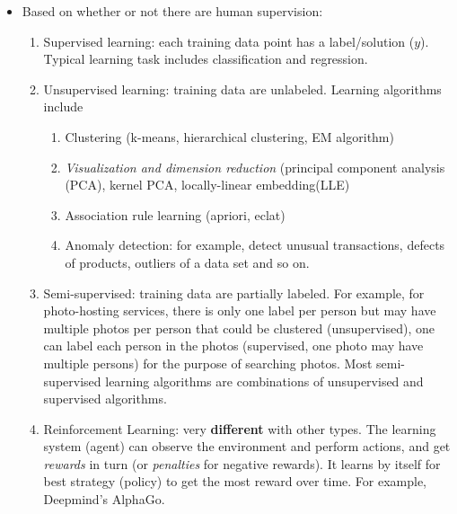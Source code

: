 \documentclass[12pt,oneside,a4paper]{article}
\numberwithin{equation}{section}
\begin{document}
\begin{itemize}
\item Based on whether or not there are human supervision: 
\begin{enumerate}
\item Supervised learning: each training data point has a label/solution ($y$). Typical learning task includes classification and regression. 
\item Unsupervised learning: training data are unlabeled. Learning algorithms include 
\begin{enumerate}
\item Clustering (k-means, hierarchical clustering, EM algorithm)
\item \emph{Visualization and dimension reduction} (principal component analysis (PCA), kernel PCA, locally-linear embedding(LLE)
\item Association rule learning (apriori, eclat)
\item Anomaly detection: for example, detect unusual transactions, defects of products, outliers of a data set and so on.  
\end{enumerate}
\item Semi-supervised: training data are partially labeled. For example, for photo-hosting services, there is only one label per person but may have multiple photos per person that could be clustered (unsupervised), one can label each person in the photos (supervised, one photo may have multiple persons) for the purpose of searching photos. Most semi-supervised learning algorithms are combinations of unsupervised and supervised algorithms.
\item Reinforcement Learning: very \textbf{different} with other types. The learning system (agent) can observe the environment and perform actions, and get \emph{rewards} in turn (or \emph{penalties} for negative rewards). It learns by itself for best strategy (policy) to get the most reward over time. For example, Deepmind's AlphaGo.
\end{enumerate}


\end{itemize}
\end{document}
